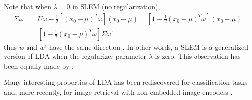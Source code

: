 Note that when $\lambda=0$ in SLEM (no regularization),
\begin{align}
\Sigma \omega & = U\omega -\frac{1}{2}[(x_0-\mu)^T \omega] (x_0-\mu) =
\left[1-\frac{1}{2}(x_0-\mu)^T \omega\right](x_0-\mu) \\
&=\left[1-\frac{1}{2}(x_0-\mu)^T \omega\right]\Sigma \omega'
\end{align}
thus $w$ and $w'$ have the same direction . In other words, a
SLEM is a generalized version of LDA when the
regularizer parameter $\lambda $ is zero.
This observation has been equally made by \cite{Koba15}.

Many interesting properties of LDA has been rediscovered for classification tasks \cite{GMPD12,HMR12} and, more recently, for image retrieval with non-embedded image encoders \cite{babenko15}.



